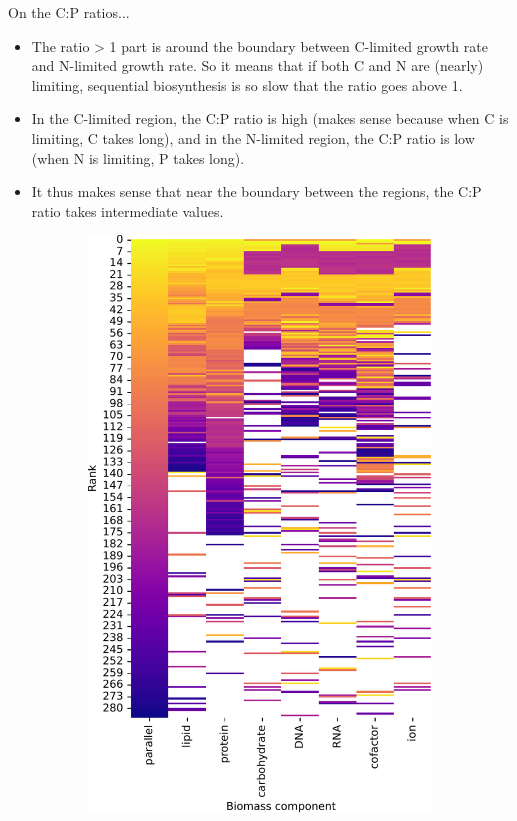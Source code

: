 On the C:P ratios...
\begin{itemize}
  \item The ratio > 1 part is around the boundary between C-limited growth rate and N-limited growth rate.
        So it means that if both C and N are (nearly) limiting, sequential biosynthesis is so slow that the ratio goes above 1.
  \item In the C-limited region, the C:P ratio is high (makes sense because when C is limiting, C takes long), and in the N-limited region, the C:P ratio is low (when N is limiting, P takes long).
  \item It thus makes sense that near the boundary between the regions, the C:P ratio takes intermediate values.
\end{itemize}

\begin{figure}
  \centering
  \begin{subfigure}[t]{0.45\textwidth}
  \centering
    \includegraphics[width=\linewidth]{CompareEnzUse_glc16p89_pyrUnres_ammUnres_1.pdf}

\end{subfigure}
\end{figure}

